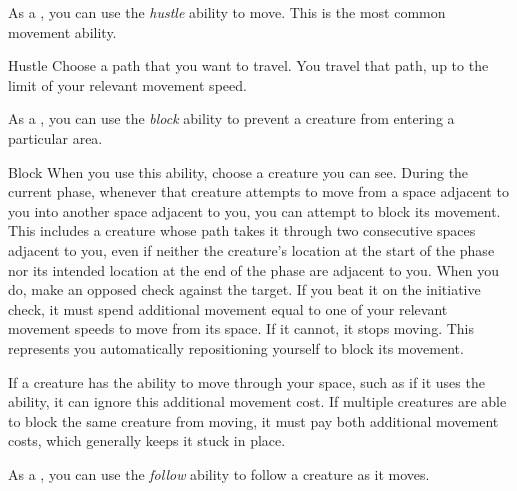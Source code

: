          As a , you can use the \textit{hustle} ability to move.
        This is the most common movement ability.

        \begin{activeability}{Hustle}
            \label{Hustle}
            \rankline
            Choose a path that you want to travel.
            You travel that path, up to the limit of your relevant movement speed.
        \end{activeability}

         As a , you can use the \textit{block} ability to prevent a creature from entering a particular area.

        \begin{activeability}{Block}
            \label{Block}
            \rankline
            When you use this ability, choose a creature you can see.
            During the current phase, whenever that creature attempts to move from a space adjacent to you into another space adjacent to you, you can attempt to block its movement.
            This includes a creature whose path takes it through two consecutive spaces adjacent to you, even if neither the creature's location at the start of the phase nor its intended location at the end of the phase are adjacent to you.
            When you do, make an opposed  check against the target.
            If you beat it on the initiative check, it must spend additional movement equal to one of your relevant movement speeds to move from its space.
            If it cannot, it stops moving.
            This represents you automatically repositioning yourself to block its movement.

            If a creature has the ability to move through your space, such as if it uses the  ability, it can ignore this additional movement cost.
            If multiple creatures are able to block the same creature from moving, it must pay both additional movement costs, which generally keeps it stuck in place.
        \end{activeability}

         As a , you can use the \textit{follow} ability to follow a creature as it moves.

